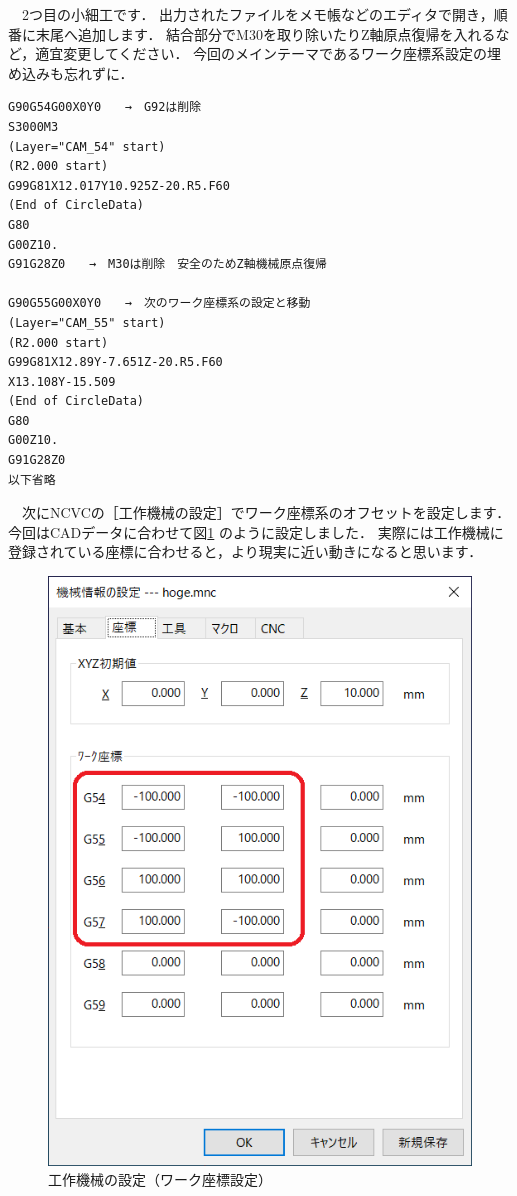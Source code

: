 

\vspace*{1zh}
　2つ目の小細工です．
出力されたファイルをメモ帳などのエディタで開き，順番に末尾へ追加します．
結合部分でM30を取り除いたりZ軸原点復帰を入れるなど，適宜変更してください．
今回のメインテーマであるワーク座標系設定の埋め込みも忘れずに．

\begin{lstlisting}[caption=編集後のNCプログラム,numbers=none,label=lst:gcode.txt]
%
G90G54G00X0Y0　　→　G92は削除
S3000M3
(Layer="CAM_54" start)
(R2.000 start)
G99G81X12.017Y10.925Z-20.R5.F60
(End of CircleData)
G80
G00Z10.
G91G28Z0　　→　M30は削除　安全のためZ軸機械原点復帰

G90G55G00X0Y0　　→　次のワーク座標系の設定と移動
(Layer="CAM_55" start)
(R2.000 start)
G99G81X12.89Y-7.651Z-20.R5.F60
X13.108Y-15.509
(End of CircleData)
G80
G00Z10.
G91G28Z0
以下省略
\end{lstlisting}

\vspace*{1zh}
　次にNCVCの［工作機械の設定］でワーク座標系のオフセットを設定します．
今回はCADデータに合わせて図\ref{fig:work} のように設定しました．
実際には工作機械に登録されている座標に合わせると，より現実に近い動きになると思います．

\begin{figure}[H]
\centering
\includegraphics[scale=0.7]{No4/fig/work.png}
\caption{工作機械の設定（ワーク座標設定）}
\label{fig:work}
\end{figure}

